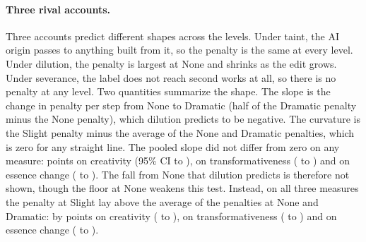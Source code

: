 \paragraph*{Three rival accounts.}
Three accounts predict different shapes across the levels. Under taint, the AI origin passes to anything built from it, so the penalty is the same at every level. Under dilution, the penalty is largest at None and shrinks as the edit grows. Under severance, the label does not reach second works at all, so there is no penalty at any level. Two quantities summarize the shape. The slope is the change in penalty per step from None to Dramatic (half of the Dramatic penalty minus the None penalty), which dilution predicts to be negative. The curvature is the Slight penalty minus the average of the None and Dramatic penalties, which is zero for any straight line. The pooled slope did not differ from zero on any measure: \XSCreatSlopeEst{} points on creativity (95\% CI \XSCreatSlopeLo{} to \XSCreatSlopeHi), \XSTransSlopeEst{} on transformativeness (\XSTransSlopeLo{} to \XSTransSlopeHi) and \XSEssSlopeEst{} on essence change (\XSEssSlopeLo{} to \XSEssSlopeHi). The fall from None that dilution predicts is therefore not shown, though the floor at None weakens this test. Instead, on all three measures the penalty at Slight lay above the average of the penalties at None and Dramatic: by \XSCreatCurvatureEst{} points on creativity (\XSCreatCurvatureLo{} to \XSCreatCurvatureHi), \XSTransCurvatureEst{} on transformativeness (\XSTransCurvatureLo{} to \XSTransCurvatureHi) and \XSEssCurvatureEst{} on essence change (\XSEssCurvatureLo{} to \XSEssCurvatureHi).

